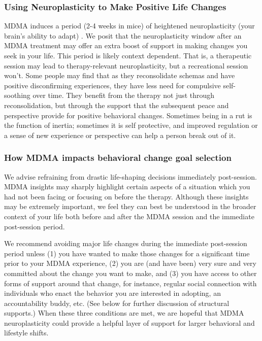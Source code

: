 \documentclass[12pt,letterpaper]{article}
\begin{document}
\subsubsection{Using Neuroplasticity to Make Positive Life Changes}
MDMA induces a period (2-4 weeks in mice) of heightened neuroplasticity (your brain's ability to adapt) \cite{nardouMDMAPlasticity}. We posit that the neuroplasticity window after an MDMA treatment may offer an extra boost of support in making changes you seek in your life. This period is likely context dependent. That is, a therapeutic session may lead to therapy-relevant neuroplasticity, but a recreational session won't. Some people may find that as they reconsolidate schemas and have positive disconfirming experiences, they have less need for compulsive self-soothing over time. They benefit from the therapy not just through reconsolidation, but through the support that the subsequent peace and perspective provide for positive behavioral changes. Sometimes being in a rut is the function of inertia; sometimes it is self protective, and improved regulation or a sense of new experience or perspective can help a person break out of it.

\subsubsection*{How MDMA impacts behavioral change goal selection}

We advise refraining from drastic life-shaping decisions immediately post-session. MDMA insights may sharply highlight certain aspects of a situation which you had not been facing or focusing on before the therapy. Although these insights may be extremely important, we feel they can best be understood in the broader context of your life both before and after the MDMA session and the immediate post-session period.

We recommend avoiding major life changes during the immediate post-session period unless (1) you have wanted to make those changes for a significant time prior to your MDMA experience, (2) you are (and have been) very sure and very committed about the change you want to make, and (3) you have access to other forms of support around that change, for instance, regular social connection with individuals who enact the behavior you are interested in adopting, an accountability buddy, etc. (See below for further discussion of structural supports.)  When these three conditions are met, we are hopeful that MDMA neuroplasticity could provide a helpful layer of support for larger behavioral and lifestyle shifts.
\end{document}
